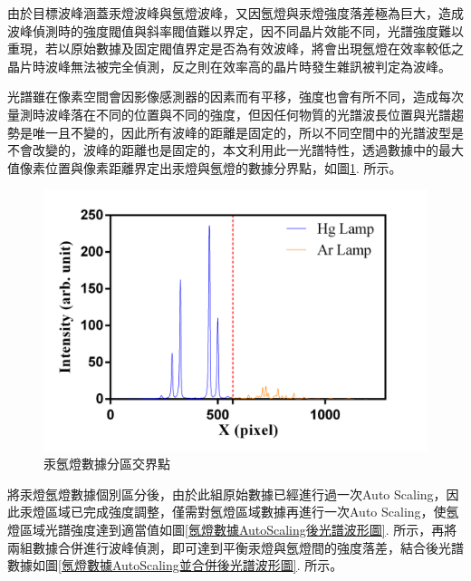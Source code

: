 由於目標波峰涵蓋汞燈波峰與氬燈波峰，又因氬燈與汞燈強度落差極為巨大，造成波峰偵測時的強度閥值與斜率閥值難以界定，因不同晶片效能不同，光譜強度難以重現，若以原始數據及固定閥值界定是否為有效波峰，將會出現氬燈在效率較低之晶片時波峰無法被完全偵測，反之則在效率高的晶片時發生雜訊被判定為波峰。\par
光譜雖在像素空間會因影像感測器的因素而有平移，強度也會有所不同，造成每次量測時波峰落在不同的位置與不同的強度，但因任何物質的光譜波長位置與光譜趨勢是唯一且不變的，因此所有波峰的距離是固定的，所以不同空間中的光譜波型是不會改變的，波峰的距離也是固定的，本文利用此一光譜特性，透過數據中的最大值像素位置與像素距離界定出汞燈與氬燈的數據分界點，如圖\ref{汞氬燈數據分區交界點}. 所示。
\begin{figure}[H] %
	\centering %
	\vspace{0.8cm}
	\setlength{\abovecaptionskip}{0.cm}
	\includegraphics[width=\textwidth]{figures/JunctionPoint.png} %
	\caption{汞氬燈數據分區交界點} %
	\label{汞氬燈數據分區交界點} %
\end{figure}
將汞燈氬燈數據個別區分後，由於此組原始數據已經進行過一次Auto Scaling，因此汞燈區域已完成強度調整，僅需對氬燈區域數據再進行一次Auto Scaling，使氬燈區域光譜強度達到適當值如圖\ref{氬燈數據AutoScaling後光譜波形圖}. 所示，再將兩組數據合併進行波峰偵測，即可達到平衡汞燈與氬燈間的強度落差，結合後光譜數據如圖\ref{氬燈數據AutoScaling並合併後光譜波形圖}. 所示。
